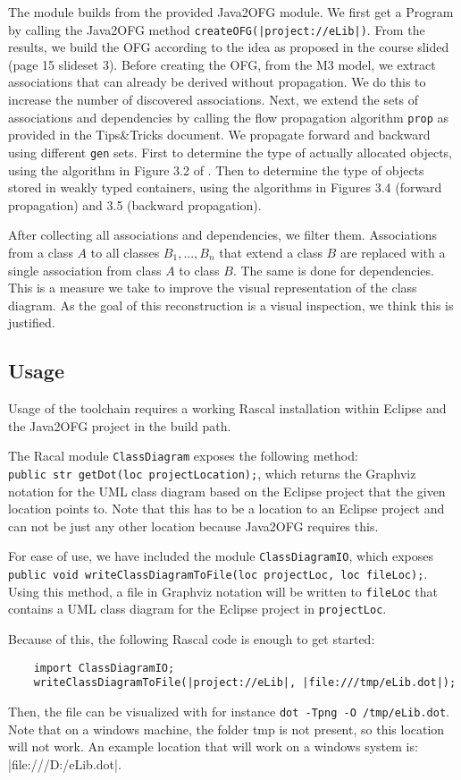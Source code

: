 \indent The module builds from the provided Java2OFG module. 
We first get a Program by calling the Java2OFG method \texttt{createOFG(|project://eLib|)}. 
From the results, we build the OFG according to the idea as proposed in the course slided (page 15 slideset 3). 
Before creating the OFG, from the M3 model, we extract associations that can already be derived without propagation. 
We do this to increase the number of discovered associations. 
Next, we extend the sets of associations and dependencies by calling the flow propagation algorithm \texttt{prop} 
as provided in the Tips\&Tricks document. 
We propagate forward and backward using different \texttt{gen} sets. 
First to determine the type of actually allocated objects, using the algorithm in Figure 3.2 of \cite{rev-eng}.
Then to determine the type of objects stored in weakly typed containers, 
using the algorithms in Figures 3.4 (forward propagation) and 3.5 (backward propagation).

After collecting all associations and dependencies, we filter them. 
Associations from a class $A$ to all classes $B_1, ... , B_n$ that extend a class $B$ 
are replaced with a single association from class $A$ to class $B$. The same is done for dependencies. 
This is a measure we take to improve the visual representation of the class diagram. 
As the goal of this reconstruction is a visual inspection, we think this is justified.

\subsection{Usage}\label{usage}
	Usage of the toolchain requires a working Rascal installation within Eclipse and the Java2OFG project in the build path.

	The Racal module \texttt{ClassDiagram} exposes the following method:\\ \texttt{public str getDot(loc projectLocation);}, which returns the Graphviz notation for the UML class diagram based on the Eclipse project that the given location points to.
	Note that this has to be a location to an Eclipse project and can not be just any other location because Java2OFG requires this.

	For ease of use, we have included the module \texttt{ClassDiagramIO}, which exposes \texttt{public void writeClassDiagramToFile(loc projectLoc, loc fileLoc);}.
	Using this method, a file in Graphviz notation will be written to \texttt{fileLoc} that contains a UML class diagram for the Eclipse project in \texttt{projectLoc}.
	
	Because of this, the following Rascal code is enough to get started:
	
	\begin{lstlisting}
	import ClassDiagramIO;
	writeClassDiagramToFile(|project://eLib|, |file:///tmp/eLib.dot|);
	\end{lstlisting}
	
	Then, the file can be visualized with for instance \texttt{dot -Tpng -O /tmp/eLib.dot}.
	Note that on a windows machine, the folder tmp is not present, so this location will not work. 
	An example location that will work on a windows system is: |file:///D:/eLib.dot|.
